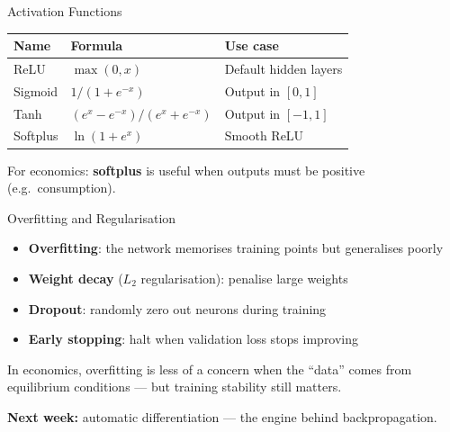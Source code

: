 \documentclass[aspectratio=169, 10pt]{beamer}
\begin{document}
\begin{frame}{Activation Functions}
\begin{center}
\begin{tabular}{lll}
\toprule
Name & Formula & Use case \\
\midrule
ReLU & $\max(0, x)$ & Default hidden layers \\
Sigmoid & $1/(1+e^{-x})$ & Output in $[0,1]$ \\
Tanh & $(e^x - e^{-x})/(e^x + e^{-x})$ & Output in $[-1,1]$ \\
Softplus & $\ln(1 + e^x)$ & Smooth ReLU \\
\bottomrule
\end{tabular}
\end{center}

\bigskip
For economics: \textbf{softplus} is useful when outputs must be positive (e.g.\ consumption).
\end{frame}

\begin{frame}{Overfitting and Regularisation}
\begin{itemize}
\item \textbf{Overfitting}: the network memorises training points but generalises poorly
\item \textbf{Weight decay} ($L_2$ regularisation): penalise large weights
\item \textbf{Dropout}: randomly zero out neurons during training
\item \textbf{Early stopping}: halt when validation loss stops improving
\end{itemize}

\bigskip
In economics, overfitting is less of a concern when the ``data'' comes from equilibrium conditions --- but training stability still matters.

\bigskip
\textbf{Next week:} automatic differentiation --- the engine behind backpropagation.
\end{frame}
\end{document}
